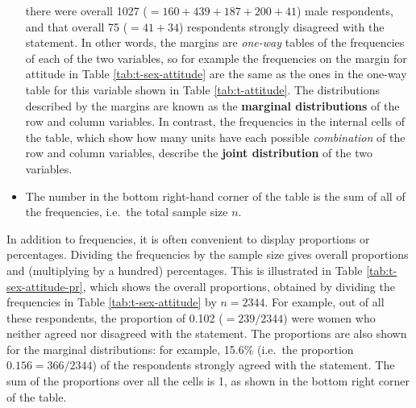 \documentclass[11pt,a4paper,openany]{book}
\begin{document}
\begin{itemize}
  there were overall 1027 (\(=160+439+187+200+41\)) male respondents,
  and that overall 75 (\(=41+34\)) respondents strongly disagreed with
  the statement. In other words, the margins are \emph{one-way} tables
  of the frequencies of each of the two variables, so for example the
  frequencies on the margin for attitude in Table
  \ref{tab:t-sex-attitude} are the same as the ones in the one-way table
  for this variable shown in Table \ref{tab:t-attitude}. The
  distributions described by the margins are known as the
  \textbf{marginal distributions} of the row and column variables. In
  contrast, the frequencies in the internal cells of the table, which
  show how many units have each possible \emph{combination} of the row
  and column variables, describe the \textbf{joint distribution} of the
  two variables.
\item
  The number in the bottom right-hand corner of the table is the sum of
  all of the frequencies, i.e.~the total sample size \(n\).
\end{itemize}

In addition to frequencies, it is often convenient to display
proportions or percentages. Dividing the frequencies by the sample size
gives overall proportions and (multiplying by a hundred) percentages.
This is illustrated in Table \ref{tab:t-sex-attitude-pr}, which shows
the overall proportions, obtained by dividing the frequencies in Table
\ref{tab:t-sex-attitude} by \(n=2344\). For example, out of all these
respondents, the proportion of 0.102 (\(=239/2344\)) were women who
neither agreed nor disagreed with the statement. The proportions are
also shown for the marginal distributions: for example, 15.6\% (i.e.~the
proportion \(0.156=366/2344\)) of the respondents strongly agreed with
the statement. The sum of the proportions over all the cells is 1, as
shown in the bottom right corner of the table.
\end{document}
